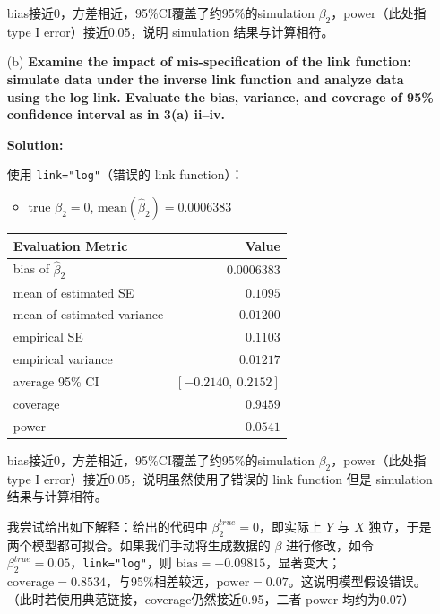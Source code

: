 \begin{enumerate}
\noindent bias接近0，方差相近，95\%CI覆盖了约95\%的simulation $\beta_2$，power（此处指 type I error）接近0.05，说明 simulation 结果与计算相符。

\bigskip

\item[(b)] \textbf{Examine the impact of mis-specification of the link function: simulate data under the inverse link function and analyze data using the log link. Evaluate the bias, variance, and coverage of 95\% confidence interval as in 3(a) ii--iv.}

\textbf{Solution:}

使用 \texttt{link="log"}（错误的 link function）：

\begin{itemize}
\item true $\beta_2 = 0$, $\text{mean}(\hat{\beta}_2) = 0.0006383$
\end{itemize}

\begin{table}[h]
\centering
\begin{tabular}{lr}
\toprule
Evaluation Metric & Value \\
\midrule
bias of $\hat{\beta}_2$ & $0.0006383$ \\
mean of estimated SE & $0.1095$ \\
mean of estimated variance & $0.01200$ \\
empirical SE & $0.1103$ \\
empirical variance & $0.01217$ \\
average 95\% CI & $[-0.2140,\ 0.2152]$ \\
coverage & $0.9459$ \\
power & $0.0541$ \\
\bottomrule
\end{tabular}
\end{table}

\noindent bias接近0，方差相近，95\%CI覆盖了约95\%的simulation $\beta_2$，power（此处指 type I error）接近0.05，说明虽然使用了错误的 link function 但是 simulation 结果与计算相符。

我尝试给出如下解释：给出的代码中 $\beta_2^{true}=0$，即实际上 $Y$ 与 $X$ 独立，于是两个模型都可拟合。如果我们手动将生成数据的 $\beta$ 进行修改，如令 $\beta_2^{true}=0.05$，\texttt{link="log"}，则 $\text{bias}=-0.09815$，显著变大；$\text{coverage}=0.8534$，与95\%相差较远，$\text{power}=0.07$。这说明模型假设错误。（此时若使用典范链接，coverage仍然接近0.95，二者 power 均约为0.07）

\end{enumerate}


